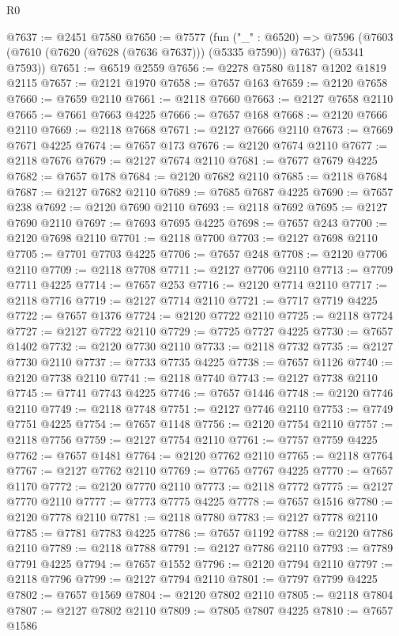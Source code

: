 \begin{lexlean}{R0}
\begin{coremodule}
@7637 := @2451 @7580
@7650 := @7577
    (fun ("_" : @6520) =>
    @7596 (@7603 (@7610 (@7620 (@7628 (@7636 @7637))) (@5335 @7590)) @7637) (@5341 @7593))
@7651 := @6519 @2559
@7656 := @2278 @7580 @1187 @1202 @1819 @2115
@7657 := @2121 @1970
@7658 := @7657 @163
@7659 := @2120 @7658
@7660 := @7659 @2110
@7661 := @2118 @7660
@7663 := @2127 @7658 @2110
@7665 := @7661 @7663 @4225
@7666 := @7657 @168
@7668 := @2120 @7666 @2110
@7669 := @2118 @7668
@7671 := @2127 @7666 @2110
@7673 := @7669 @7671 @4225
@7674 := @7657 @173
@7676 := @2120 @7674 @2110
@7677 := @2118 @7676
@7679 := @2127 @7674 @2110
@7681 := @7677 @7679 @4225
@7682 := @7657 @178
@7684 := @2120 @7682 @2110
@7685 := @2118 @7684
@7687 := @2127 @7682 @2110
@7689 := @7685 @7687 @4225
@7690 := @7657 @238
@7692 := @2120 @7690 @2110
@7693 := @2118 @7692
@7695 := @2127 @7690 @2110
@7697 := @7693 @7695 @4225
@7698 := @7657 @243
@7700 := @2120 @7698 @2110
@7701 := @2118 @7700
@7703 := @2127 @7698 @2110
@7705 := @7701 @7703 @4225
@7706 := @7657 @248
@7708 := @2120 @7706 @2110
@7709 := @2118 @7708
@7711 := @2127 @7706 @2110
@7713 := @7709 @7711 @4225
@7714 := @7657 @253
@7716 := @2120 @7714 @2110
@7717 := @2118 @7716
@7719 := @2127 @7714 @2110
@7721 := @7717 @7719 @4225
@7722 := @7657 @1376
@7724 := @2120 @7722 @2110
@7725 := @2118 @7724
@7727 := @2127 @7722 @2110
@7729 := @7725 @7727 @4225
@7730 := @7657 @1402
@7732 := @2120 @7730 @2110
@7733 := @2118 @7732
@7735 := @2127 @7730 @2110
@7737 := @7733 @7735 @4225
@7738 := @7657 @1126
@7740 := @2120 @7738 @2110
@7741 := @2118 @7740
@7743 := @2127 @7738 @2110
@7745 := @7741 @7743 @4225
@7746 := @7657 @1446
@7748 := @2120 @7746 @2110
@7749 := @2118 @7748
@7751 := @2127 @7746 @2110
@7753 := @7749 @7751 @4225
@7754 := @7657 @1148
@7756 := @2120 @7754 @2110
@7757 := @2118 @7756
@7759 := @2127 @7754 @2110
@7761 := @7757 @7759 @4225
@7762 := @7657 @1481
@7764 := @2120 @7762 @2110
@7765 := @2118 @7764
@7767 := @2127 @7762 @2110
@7769 := @7765 @7767 @4225
@7770 := @7657 @1170
@7772 := @2120 @7770 @2110
@7773 := @2118 @7772
@7775 := @2127 @7770 @2110
@7777 := @7773 @7775 @4225
@7778 := @7657 @1516
@7780 := @2120 @7778 @2110
@7781 := @2118 @7780
@7783 := @2127 @7778 @2110
@7785 := @7781 @7783 @4225
@7786 := @7657 @1192
@7788 := @2120 @7786 @2110
@7789 := @2118 @7788
@7791 := @2127 @7786 @2110
@7793 := @7789 @7791 @4225
@7794 := @7657 @1552
@7796 := @2120 @7794 @2110
@7797 := @2118 @7796
@7799 := @2127 @7794 @2110
@7801 := @7797 @7799 @4225
@7802 := @7657 @1569
@7804 := @2120 @7802 @2110
@7805 := @2118 @7804
@7807 := @2127 @7802 @2110
@7809 := @7805 @7807 @4225
@7810 := @7657 @1586

\end{coremodule}
\end{lexlean}
